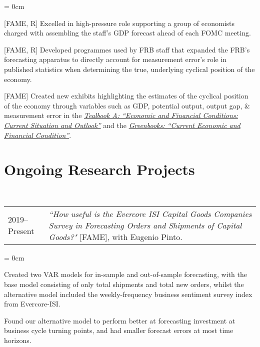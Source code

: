 \documentclass[a4paper, 11pt]{article}
\begin{document}
    \begin{compactitem}\parskip = 0cm
      \item {[FAME, R]} Excelled in high-pressure role supporting a group of economists charged with assembling the staff's GDP forecast ahead of each FOMC meeting.
      \item {[FAME, R]} Developed programmes used by FRB staff that expanded the FRB's forecasting apparatus to directly account for measurement error's role in published statistics when determining the true, underlying cyclical position of the economy.
      \item {[FAME]} Created new exhibits highlighting the estimates of the cyclical position of the economy through variables such as GDP, potential output, output gap, \& measurement error in the \href{https://www.federalreserve.gov/monetarypolicy/fomc_historical.htm#tealbooks}{\textit{Tealbook A: ``Economic and Financial Conditions: Current Situation and Outlook''}} and the \href{https://www.federalreserve.gov/monetarypolicy/fomc_historical.htm#greenbooks}{\textit{Greenbooks: ``Current Economic and Financial Condition''}}.
    \end{compactitem}

  \section{Ongoing Research Projects}
    ~\begin{tabular}{lP{15cm}}
      2019--Present & \textit{``How useful is the Evercore ISI Capital Goods Companies Survey in Forecasting Orders and Shipments of Capital Goods?"} {[FAME]}, with Eugenio Pinto.
    \end{tabular}

    \begin{compactitem}\parskip = 0cm
      \item Created two VAR models for in-sample and out-of-sample forecasting, with the base model consisting of only total shipments and total new orders, whilst the alternative model included the weekly-frequency business sentiment survey index from Evercore-ISI.
      \item Found our alternative model to perform better at forecasting investment at business cycle turning points, and had smaller forecast errors at most time horizons.
    \end{compactitem}
\end{document}
